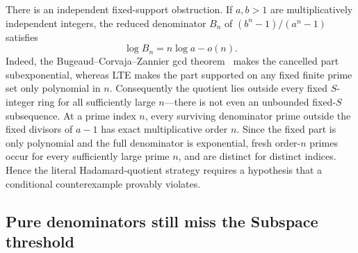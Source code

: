 \documentclass[11pt,oneside]{article}
\theoremstyle{definition}
\theoremstyle{remark}
\begin{document}
There is an independent fixed-support obstruction.  If $a,b>1$ are multiplicatively
independent integers, the reduced denominator $B_n$ of
$(b^n-1)/(a^n-1)$ satisfies
\begin{equation}
 \log B_n=n\log a-o(n).
 \label{crit:eq-bcz-denominator}
\end{equation}
Indeed, the Bugeaud--Corvaja--Zannier gcd theorem~\cite{BCZ2003} makes the cancelled part subexponential,
whereas LTE makes the part supported on any fixed finite prime set only polynomial in $n$.
Consequently the quotient lies outside every fixed $S$-integer ring for all sufficiently
large $n$---there is not even an unbounded fixed-$S$ subsequence.  At a prime index $n$,
every surviving denominator prime outside the fixed divisors of $a-1$ has exact
multiplicative order $n$.  Since the fixed part is only polynomial and the full denominator
is exponential, fresh order-$n$ primes occur for every sufficiently large prime $n$, and are
distinct for distinct indices.  Hence the literal Hadamard-quotient strategy requires a
hypothesis that a conditional counterexample provably violates.

\subsection{Pure denominators still miss the Subspace threshold}
\label{crit:ridout}
\end{document}

